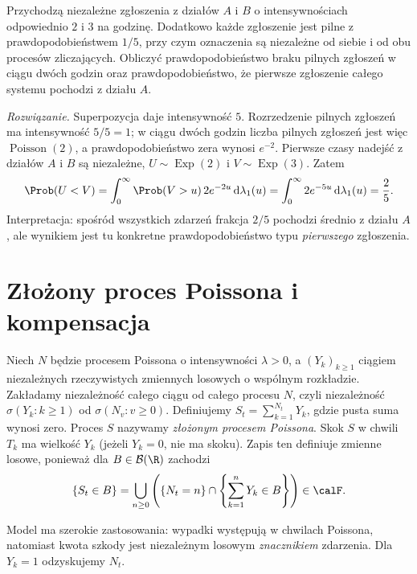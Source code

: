 \begin{zadanie}
Przychodzą niezależne zgłoszenia z działów $A$ i $B$
o intensywnościach odpowiednio $2$ i $3$ na godzinę.
Dodatkowo każde zgłoszenie jest pilne z prawdopodobieństwem
$1/5$, przy czym oznaczenia są niezależne od siebie
i od obu procesów zliczających. Obliczyć
prawdopodobieństwo braku pilnych zgłoszeń w ciągu dwóch godzin
oraz prawdopodobieństwo, że pierwsze zgłoszenie całego systemu
pochodzi z działu $A$.

\emph{Rozwiązanie.} Superpozycja daje intensywność $5$.
Rozrzedzenie pilnych zgłoszeń ma intensywność $5/5=1$;
w ciągu dwóch godzin liczba pilnych zgłoszeń jest więc
$\operatorname{Poisson}(2)$, a prawdopodobieństwo zera wynosi
$e^{-2}$.
Pierwsze czasy nadejść z działów $A$ i $B$ są niezależne,
$U\sim\operatorname{Exp}(2)$ i
$V\sim\operatorname{Exp}(3)$. Zatem
\[
\Prob(U<V)=\int_0^\infty \Prob(V>u)\,2e^{-2u}\,\mathrm d\lambda_1(u)
=\int_0^\infty 2e^{-5u}\,\mathrm d\lambda_1(u)=\frac25.
\]
Interpretacja: spośród wszystkich zdarzeń frakcja $2/5$
pochodzi średnio z działu $A$, ale wynikiem jest tu
konkretne prawdopodobieństwo typu \emph{pierwszego} zgłoszenia.
\end{zadanie}

\section{Złożony proces Poissona i kompensacja}
\begin{definicja}
Niech $N$ będzie procesem Poissona o intensywności $\lambda>0$,
a $(Y_k)_{k\ge1}$ ciągiem niezależnych rzeczywistych
zmiennych losowych o wspólnym rozkładzie. Zakładamy
niezależność całego ciągu od całego procesu $N$,
czyli niezależność $\sigma(Y_k:k\ge1)$ od
$\sigma(N_v:v\ge0)$.
Definiujemy $S_t=\sum_{k=1}^{N_t}Y_k$,
gdzie pusta suma wynosi zero. Proces $S$ nazywamy
\emph{złożonym procesem Poissona}. Skok $S$ w chwili $T_k$
ma wielkość $Y_k$ (jeżeli $Y_k=0$, nie ma skoku).
Zapis ten definiuje zmienne losowe, ponieważ
dla $B\in\mathcal B(\R)$ zachodzi
\[
\{S_t\in B\}=\bigcup_{n\ge0}
\left(\{N_t=n\}\cap
\left\{\sum_{k=1}^nY_k\in B\right\}\right)\in\calF.
\]
\end{definicja}

Model ma szerokie zastosowania: wypadki występują w chwilach
Poissona, natomiast kwota szkody jest niezależnym losowym
\emph{znacznikiem} zdarzenia. Dla $Y_k=1$ odzyskujemy $N_t$.

